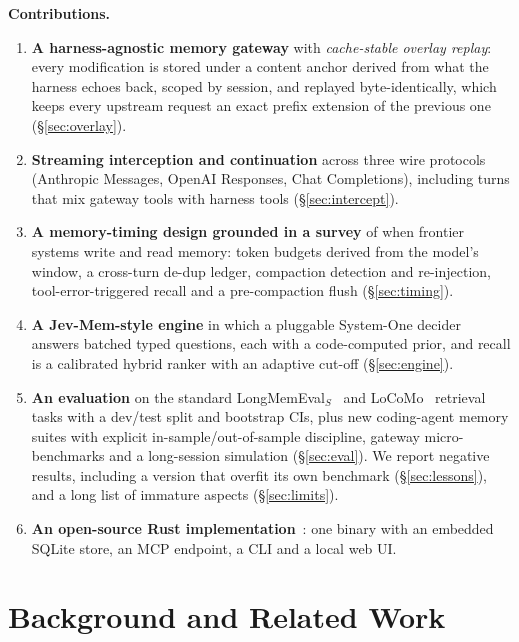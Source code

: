 \documentclass[10pt,twocolumn]{article}
\newcommand{\para}[1]{\smallskip\noindent\textbf{#1}\ }
\begin{document}
\para{Contributions.}
\begin{enumerate}
\item \textbf{A harness-agnostic memory gateway} with \emph{cache-stable overlay replay}: every modification is
  stored under a content anchor derived from what the harness echoes back, scoped by session, and replayed
  byte-identically, which keeps every upstream request an exact prefix extension of the previous one (\S\ref{sec:overlay}).
\item \textbf{Streaming interception and continuation} across three wire protocols (Anthropic Messages, OpenAI
  Responses, Chat Completions), including turns that mix gateway tools with harness tools (\S\ref{sec:intercept}).
\item \textbf{A memory-timing design grounded in a survey} of when frontier systems write and read memory: token
  budgets derived from the model's window, a cross-turn de-dup ledger, compaction detection and re-injection,
  tool-error-triggered recall and a pre-compaction flush (\S\ref{sec:timing}).
\item \textbf{A Jev-Mem-style engine} in which a pluggable System-One decider answers batched typed questions,
  each with a code-computed prior, and recall is a calibrated hybrid ranker with an adaptive cut-off (\S\ref{sec:engine}).
\item \textbf{An evaluation} on the standard LongMemEval$_S$~\cite{longmemeval} and LoCoMo~\cite{locomo} retrieval
  tasks with a dev/test split and bootstrap CIs, plus new coding-agent memory suites with explicit in-sample/out-of-sample
  discipline, gateway micro-benchmarks and a long-session simulation (\S\ref{sec:eval}). We report negative results,
  including a version that overfit its own benchmark (\S\ref{sec:lessons}), and a long list of immature aspects (\S\ref{sec:limits}).
\item \textbf{An open-source Rust implementation}~\cite{unimemrepo}: one binary with an embedded SQLite store, an
  MCP endpoint, a CLI and a local web UI.
\end{enumerate}

\section{Background and Related Work}
\label{sec:related}
\end{document}
